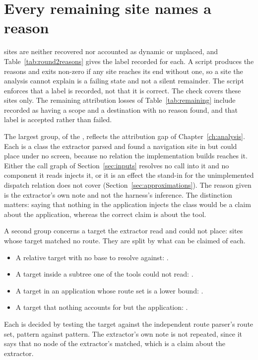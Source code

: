 \section{Every remaining site names a reason}
\label{app:reasons}

\RoundTwoUnexplained{} sites are neither recovered nor accounted as dynamic or unplaced, and Table~\ref{tab:round2reasons} gives the label recorded for each. A script produces the reasons and exits non-zero if any site reaches its end without one, so a site the analysis cannot explain is a failing state and not a silent remainder. The script enforces that a label is recorded, not that it is correct. The check covers these sites only. The remaining attribution losses of Table~\ref{tab:remaining} include \AttrRemainingUnexplained{} recorded as having a scope and a destination with no reason found, and that label is accepted rather than failed.

The largest group, \RoundTwoUnplacedClass{} of the \RoundTwoUnexplained{}, reflects the attribution gap of Chapter~\ref{ch:analysis}. Each is a class the extractor parsed and found a navigation site in but could place under no screen, because no relation the implementation builds reaches it. Either the call graph of Section~\ref{sec:inputs} resolves no call into it and no component it reads injects it, or it is an effect the stand-in for the unimplemented dispatch relation does not cover (Section~\ref{sec:approximations}). The reason given is the extractor's own note and not the harness's inference. The distinction matters: saying that nothing in the application injects the class would be a claim about the application, whereas the correct claim is about the tool.

A second group concerns a target the extractor read and could not place: \RoundTwoTargetNoRoute{} sites whose target matched no route. They are split by what can be claimed of each.
\begin{itemize}
\item A relative target with no base to resolve against: \RoundTwoRelativeUnresolved{}.
\item A target inside a subtree one of the tools could not read: \RoundTwoUnderUnreadable{}.
\item A target in an application whose route set is a lower bound: \RoundTwoNoRouteCaveated{}.
\item A target that nothing accounts for but the application: \RoundTwoDeadLinkUnanswered{}.
\end{itemize}
Each is decided by testing the target against the independent route parser's route set, pattern against pattern. The extractor's own note is not repeated, since it says that no node of the extractor's matched, which is a claim about the extractor.

